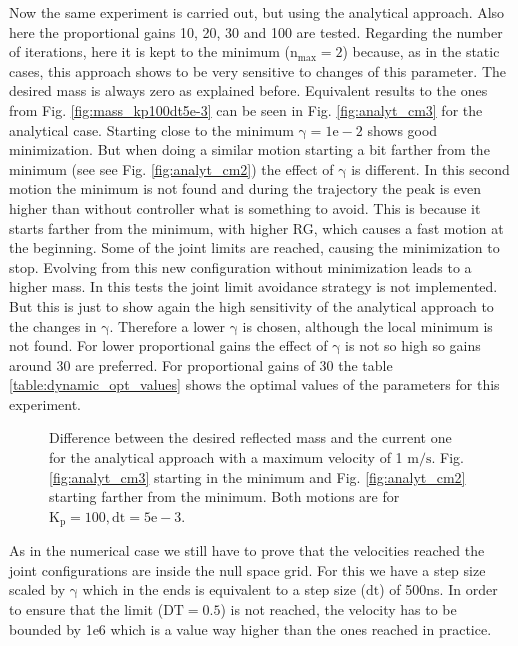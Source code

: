 Now the same experiment is carried out, but using the analytical approach.
Also here the proportional gains 10, 20, 30 and 100 are tested.  Regarding the number of iterations, here it is kept to the minimum ($\mathrm{n_{max}=2}$) because, as in the static cases, this approach shows to be very sensitive to changes of this parameter.
The desired mass is always zero as explained before.  Equivalent results to the ones from  Fig. \ref{fig:mass_kp100dt5e-3} can be seen in Fig. \ref{fig:analyt_cm3} for the analytical case. Starting close to the minimum $\mathrm{\gamma = 1e-2}$ shows good minimization. But when doing a similar motion starting a bit farther from the minimum (see see Fig. \ref{fig:analyt_cm2}) the effect of $\mathrm{\gamma}$ is different. In this second motion the minimum is not found and during the trajectory the peak is even higher than without controller what is something to avoid. This is because it starts farther from the minimum, with higher RG, which causes a fast motion at the beginning. Some of the joint limits are reached, causing the minimization to stop. Evolving from this new configuration without minimization leads to a higher mass. In this tests the joint limit avoidance strategy is not implemented. But this is just to show again the high sensitivity of the analytical approach to the changes in $\mathrm{\gamma}$.
Therefore a lower $\mathrm{\gamma}$ is chosen, although the local minimum is not found. 
For lower proportional gains the effect of $\mathrm{\gamma}$ is not so high so gains around 30 are preferred.
For proportional gains of 30 the table \ref{table:dynamic_opt_values} shows the optimal values of the parameters for this experiment. \\
%
%
\begin{figure}[!htp!]
	\centering	
	 	 	 	
	\caption{Difference between the desired reflected mass and the current one for the analytical approach with a maximum velocity of 1 $\mathrm{m/s}$.   Fig. \ref{fig:analyt_cm3} starting in the minimum and
 	  Fig. \ref{fig:analyt_cm2} starting farther from the minimum. Both motions are for $\mathrm{K_p = 100, dt=5e-3}$.}
	\label{fig:analyt_cm2and3}
\end{figure}
%
As in the numerical case we still have to prove that the velocities reached the joint configurations are inside the null space grid. For this we have a step size scaled by $\mathrm{\gamma}$ which in the ends is equivalent to a step size ($\mathrm{dt}$) of 500ns. In order to ensure that the limit ($\mathrm{DT=0.5}$) is not reached, the velocity has to be bounded by 1e6 which is a value way higher than the ones reached in practice.


